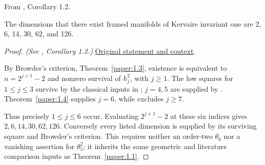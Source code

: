 \begin{corollary}
\label{paper:1.2}
From \cite{LWX126}, Corollary 1.2.\par
The dimensions that there exist framed manifolds of Kervaire invariant one are 2, 6, 14, 30, 62, and 126.


\end{corollary}
\begin{proof}
\textit{(See \cite{LWX126}, Corollary 1.2.)} \href{paper/main.tex.html#L108}{Original statement and context}.

By Browder's criterion, Theorem~\ref{paper:1.3}, existence is equivalent to $n=2^{j+1}-2$ and nonzero survival of $h_j^2$, with $j\ge1$. The low squares for $1\le j\le3$ survive by the classical inputs in \cite{MayThesis1964}; $j=4,5$ are supplied by \cite{MahowaldTangora,BJMtheta5}. Theorem~\ref{paper:1.4} supplies $j=6$, while \cite{HHR} excludes $j\ge7$.

Thus precisely $1\le j\le6$ occur. Evaluating $2^{j+1}-2$ at these six indices gives $2,6,14,30,62,126$. Conversely every listed dimension is supplied by its surviving square and Browder's criterion. This requires neither an order-two $\theta_6$ nor a vanishing assertion for $\theta_5^2$; it inherits the same geometric and literature comparison inputs as Theorem~\ref{paper:1.1}.
\end{proof}

